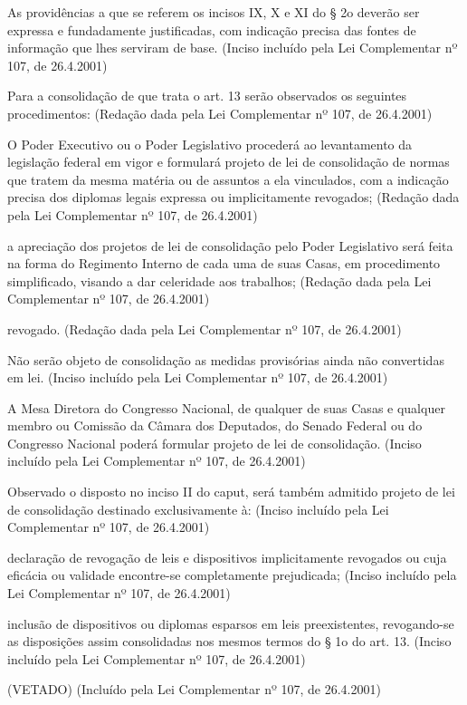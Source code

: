 \documentclass[calibri]{brlex2}
\begin{document}
\so As providências a que se referem os incisos IX, X e XI do § 2o deverão ser expressa e fundadamente justificadas, com indicação precisa das fontes de informação que lhes serviram de base.   (Inciso incluído pela Lei Complementar nº 107, de 26.4.2001)

\art Para a consolidação de que trata o art. 13 serão observados os seguintes procedimentos:     (Redação dada pela Lei Complementar nº 107, de 26.4.2001)

\inc O Poder Executivo ou o Poder Legislativo procederá ao levantamento da legislação federal em vigor e formulará projeto de lei de consolidação de normas que tratem da mesma matéria ou de assuntos a ela vinculados, com a indicação precisa dos diplomas legais expressa ou implicitamente revogados;      (Redação dada pela Lei Complementar nº 107, de 26.4.2001)

\inc a apreciação dos projetos de lei de consolidação pelo Poder Legislativo será feita na forma do Regimento Interno de cada uma de suas Casas, em procedimento simplificado, visando a dar celeridade aos trabalhos;    (Redação dada pela Lei Complementar nº 107, de 26.4.2001)

\inc revogado.   (Redação dada pela Lei Complementar nº 107, de 26.4.2001)

\so Não serão objeto de consolidação as medidas provisórias ainda não convertidas em lei.     (Inciso incluído pela Lei Complementar nº 107, de 26.4.2001)

\so A Mesa Diretora do Congresso Nacional, de qualquer de suas Casas e qualquer membro ou Comissão da Câmara dos Deputados, do Senado Federal ou do Congresso Nacional poderá formular projeto de lei de consolidação.    (Inciso incluído pela Lei Complementar nº 107, de 26.4.2001)

\so Observado o disposto no inciso II do caput, será também admitido projeto de lei de consolidação destinado exclusivamente à:    (Inciso incluído pela Lei Complementar nº 107, de 26.4.2001)

\inc declaração de revogação de leis e dispositivos implicitamente revogados ou cuja eficácia ou validade encontre-se completamente prejudicada;    (Inciso incluído pela Lei Complementar nº 107, de 26.4.2001)

\inc inclusão de dispositivos ou diplomas esparsos em leis preexistentes, revogando-se as disposições assim consolidadas nos mesmos termos do § 1o do art. 13.     (Inciso incluído pela Lei Complementar nº 107, de 26.4.2001)

\so (VETADO)     (Incluído pela Lei Complementar nº 107, de 26.4.2001)
\end{document}
